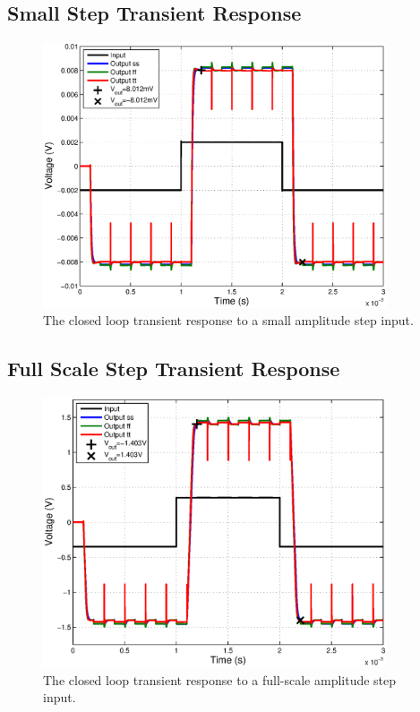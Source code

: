 \documentclass[journal]{IEEEtran}
\begin{document}
\subsection{Small Step Transient Response}
\begin{figure}
\centering
\includegraphics[width=4in]{Plots/closed_small_step.eps}
\caption{The closed loop transient response to a small amplitude step input.}
\label{fig:closed_small_step}
\end{figure}


\subsection{Full Scale Step Transient Response}
\begin{figure}
\centering
\includegraphics[width=4in]{Plots/closed_large_step.eps}
\caption{The closed loop transient response to a full-scale amplitude step input.}
\label{fig:closed_large_step}
\end{figure}
\end{document}
